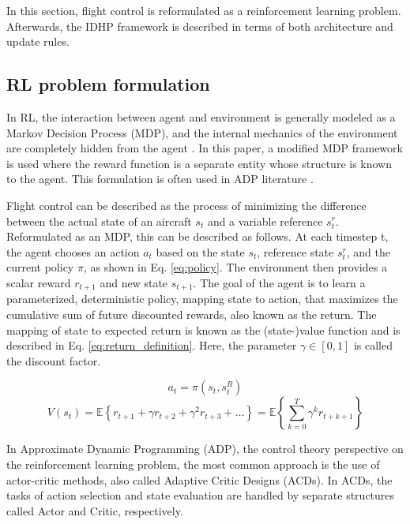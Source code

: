 In this section, flight control is reformulated as a reinforcement learning problem. Afterwards, the IDHP framework is described in terms of both architecture and update rules.

\subsection{RL problem formulation} \label{ssec:rlproblem}
In RL, the interaction between agent and environment is generally modeled as a Markov Decision Process (MDP), and the internal mechanics of the environment are completely hidden from the agent \cite{book:suttonbarto}. In this paper, a modified MDP framework is used where the reward function is a separate entity whose structure is known to the agent. This formulation is often used in ADP literature \cite{Bertsekas2000, Enns2002, Enns2003a, Enns2003b, Ferrari2004,VanKampen2006}.  

Flight control can be described as the process of minimizing the difference between the actual state of an aircraft $s_t$ and a variable reference $s_t^{r}$. Reformulated as an MDP, this can be described as follows. At each timestep t, the agent chooses an action $a_t$ based on the state $s_t$, reference state $s_t^r$, and the current policy $\pi$, as shown in Eq. \eqref{eq:policy}. The environment then provides a scalar reward $r_{t+1}$ and new state $s_{t+1}$. The goal of the agent is to learn a parameterized, deterministic policy, mapping state to action, that maximizes the cumulative sum of future discounted rewards, also known as the return. The mapping of state to expected return is known as the (state-)value function and is described in Eq. \eqref{eq:return_definition}. Here, the parameter $\gamma \in [0,1]$ is called the discount factor.

\begin{equation} \label{eq:policy}
    a_t = \pi( s_t, s_t^R)
\end{equation}
\begin{equation} \label{eq:return_definition}
    V(s_t) = \mathbb{E} \left\{ r_{t+1} + \gamma r_{t+2} + \gamma^2 r_{t+3} + \ldots \right\} = \mathbb{E} \left\{\sum_{k=0}^T \gamma^k r_{t+k+1} \right\}
\end{equation}

In Approximate Dynamic Programming (ADP), the control theory perspective on the reinforcement learning problem, the most common approach is the use of actor-critic methods, also called Adaptive Critic Designs (ACDs). In ACDs, the tasks of action selection and state evaluation are handled by separate structures called Actor and Critic, respectively.

